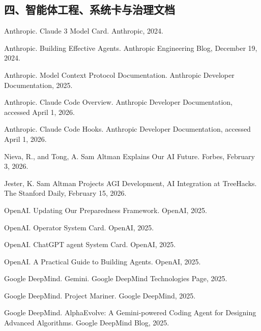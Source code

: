 \documentclass[12pt,a4paper]{article}
\begin{document}
\subsection*{四、智能体工程、系统卡与治理文档}
\begin{enumerate}[label={[\arabic*]}, resume]
    \item Anthropic. Claude 3 Model Card. Anthropic, 2024.

    \item Anthropic. Building Effective Agents. Anthropic Engineering Blog, December 19, 2024.

    \item Anthropic. Model Context Protocol Documentation. Anthropic Developer Documentation, 2025.

    \item Anthropic. Claude Code Overview. Anthropic Developer Documentation, accessed April 1, 2026.

    \item Anthropic. Claude Code Hooks. Anthropic Developer Documentation, accessed April 1, 2026.

    \item Nieva, R., and Tong, A. Sam Altman Explains Our AI Future. Forbes, February 3, 2026.

    \item Jester, K. Sam Altman Projects AGI Development, AI Integration at TreeHacks. The Stanford Daily, February 15, 2026.

    \item OpenAI. Updating Our Preparedness Framework. OpenAI, 2025.

    \item OpenAI. Operator System Card. OpenAI, 2025.

    \item OpenAI. ChatGPT agent System Card. OpenAI, 2025.

    \item OpenAI. A Practical Guide to Building Agents. OpenAI, 2025.

    \item Google DeepMind. Gemini. Google DeepMind Technologies Page, 2025.

    \item Google DeepMind. Project Mariner. Google DeepMind, 2025.

    \item Google DeepMind. AlphaEvolve: A Gemini-powered Coding Agent for Designing Advanced Algorithms. Google DeepMind Blog, 2025.


\end{enumerate}
\end{document}
